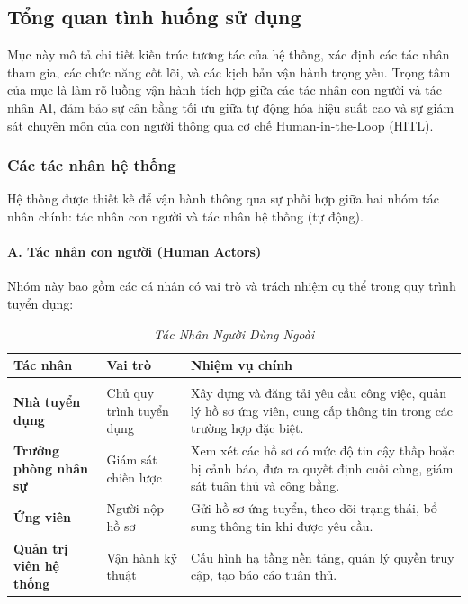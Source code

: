 \documentclass{article}
\begin{document}
\subsection{Tổng quan tình huống sử dụng}
Mục này mô tả chi tiết kiến trúc tương tác của hệ thống, xác định các tác nhân tham gia, các chức năng cốt lõi, và các kịch bản vận hành trọng yếu. Trọng tâm của mục là làm rõ luồng vận hành tích hợp giữa các tác nhân con người và tác nhân AI, đảm bảo sự cân bằng tối ưu giữa tự động hóa hiệu suất cao và sự giám sát chuyên môn của con người thông qua cơ chế Human-in-the-Loop (HITL).

\subsubsection{Các tác nhân hệ thống}
Hệ thống được thiết kế để vận hành thông qua sự phối hợp giữa hai nhóm tác nhân chính: tác nhân con người và tác nhân hệ thống (tự động).

\paragraph{A. Tác nhân con người (Human Actors)}
Nhóm này bao gồm các cá nhân có vai trò và trách nhiệm cụ thể trong quy trình tuyển dụng:

\begin{longtable}{|
  >{\raggedright\arraybackslash}p{}|
  >{\raggedright\arraybackslash}p{}|
  >{\raggedright\arraybackslash}p{}|}
  \hline
  \textbf{Tác nhân} &
  \textbf{Vai trò} &
  \textbf{Nhiệm vụ chính} \\
  \hline
  \endfirsthead

  \endhead

  \hline
  \endfoot

  \hline
  \caption{\centering\textit{Tác Nhân Người Dùng Ngoài}}
  \label{tab:external-user-actors} \\
  \endlastfoot

  \textbf{Nhà tuyển dụng} &
  Chủ quy trình tuyển dụng &
  Xây dựng và đăng tải yêu cầu công việc, quản lý hồ sơ ứng viên, cung cấp thông tin trong các trường hợp đặc biệt. \\
  \hline

  \textbf{Trưởng phòng nhân sự} &
  Giám sát chiến lược &
  Xem xét các hồ sơ có mức độ tin cậy thấp hoặc bị cảnh báo, đưa ra quyết định cuối cùng, giám sát tuân thủ và công bằng. \\
  \hline

  \textbf{Ứng viên} &
  Người nộp hồ sơ &
  Gửi hồ sơ ứng tuyển, theo dõi trạng thái, bổ sung thông tin khi được yêu cầu. \\
  \hline

  \textbf{Quản trị viên hệ thống} &
  Vận hành kỹ thuật &
  Cấu hình hạ tầng nền tảng, quản lý quyền truy cập, tạo báo cáo tuân thủ. \\
\end{longtable}
\end{document}

